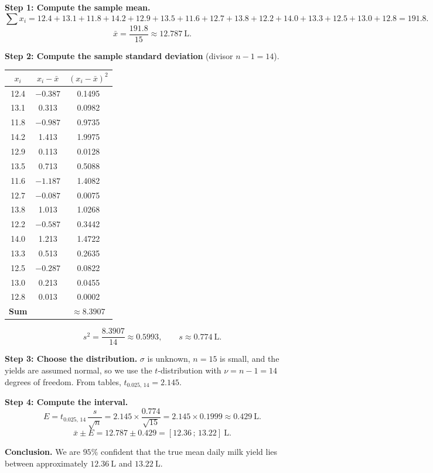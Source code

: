 \documentclass[11pt]{article}
\begin{document}
\begin{corrige}
\textbf{Step 1: Compute the sample mean.}
\[ \sum x_i = 12.4 + 13.1 + 11.8 + 14.2 + 12.9 + 13.5 + 11.6 + 12.7 + 13.8 + 12.2 + 14.0 + 13.3 + 12.5 + 13.0 + 12.8 = 191.8. \]
\[ \bar{x} = \frac{191.8}{15} \approx 12.787\ \mathrm{L}. \]

\textbf{Step 2: Compute the sample standard deviation} (divisor $n-1 = 14$).
\begin{center}
\begin{tabular}{|c|c|c|}
\hline
\rowcolor{popblueL} $x_i$ & $x_i - \bar{x}$ & $(x_i - \bar{x})^2$ \\
\hline
12.4 & $-0.387$ & 0.1495 \\
13.1 & 0.313 & 0.0982 \\
11.8 & $-0.987$ & 0.9735 \\
14.2 & 1.413 & 1.9975 \\
12.9 & 0.113 & 0.0128 \\
13.5 & 0.713 & 0.5088 \\
11.6 & $-1.187$ & 1.4082 \\
12.7 & $-0.087$ & 0.0075 \\
13.8 & 1.013 & 1.0268 \\
12.2 & $-0.587$ & 0.3442 \\
14.0 & 1.213 & 1.4722 \\
13.3 & 0.513 & 0.2635 \\
12.5 & $-0.287$ & 0.0822 \\
13.0 & 0.213 & 0.0455 \\
12.8 & 0.013 & 0.0002 \\
\hline
\textbf{Sum} & & $\approx 8.3907$ \\
\hline
\end{tabular}
\end{center}
\[ s^2 = \frac{8.3907}{14} \approx 0.5993, \qquad s \approx 0.774\ \mathrm{L}. \]

\textbf{Step 3: Choose the distribution.} $\sigma$ is unknown, $n = 15$ is small, and the yields are assumed normal, so we use the $t$-distribution with $\nu = n - 1 = 14$ degrees of freedom. From tables, $t_{0.025,\,14} = 2.145$.

\textbf{Step 4: Compute the interval.}
\[ E = t_{0.025,\,14}\,\frac{s}{\sqrt{n}} = 2.145 \times \frac{0.774}{\sqrt{15}} = 2.145 \times 0.1999 \approx 0.429\ \mathrm{L}. \]
\[ \bar{x} \pm E = 12.787 \pm 0.429 = [12.36\,;\,13.22]\ \mathrm{L}. \]

\textbf{Conclusion.} We are $95\%$ confident that the true mean daily milk yield lies between approximately $12.36\ \mathrm{L}$ and $13.22\ \mathrm{L}$.
\end{corrige}
\end{document}
